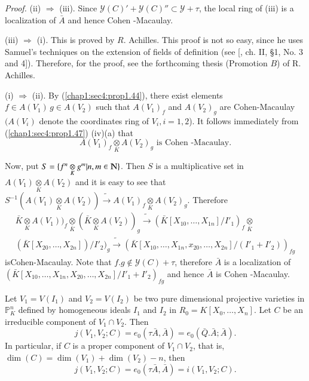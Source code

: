 \noindent \textit{Proof.}
(ii) $\Rightarrow$ (iii). Since $\mathscr{Y}(C)'+\mathscr
  {Y}(C)''\subset \mathscr{Y}+ \tau$, the local ring of (iii) is a
  localization of $\bar{A}$ and hence Cohen -Macaulay.  

(iii) $\Rightarrow$ (i). This is proved by $R$. Achilles. This proof
  is not so easy, since he uses Samuel's techniques on the extension
  of fields of definition (see [\cite{69}, ch. II, \S 1, No. 3  and
    4]). Therefore, for the proof, see the forthcoming thesis
  (Promotion $B$) of R. Achilles. 

(i) $\Rightarrow$ (ii). By (\ref{chap1:sec4:prop1.44}), there exist
  elements $f \in  
  A(V_1)\, g \in  A(V_2) $ such that $A(V_1)_f$ and $A(V_2)_g$
  are Cohen-Macaulay $(A(V_i)$ denote the coordinates ring of $ V_i,i=
  1,2$). It follows immediately from (\ref{chap1:sec4:prop1.47}) (iv)(a) that  
  \begin{equation*}
    A(V_1)_f  \underset{K}{\otimes} A(V_2)_g \text{ is Cohen
      -Macaulay.}\tag*{$\Box$} 
  \end{equation*}

Now, put $S=\{f^n \underset{K}{\otimes}g^m |n,m \in 
\varmathbb{N}\}$. Then $S$ is a multiplicative set in $ A(V_1)
\underset{K}{\otimes}A(V_2)$ and it is easy to see that 
 $S^{-1}(A(V_1) \underset{K}{\otimes}A(V_2)) \widetilde
 {\rightarrow}A(V_1)_f \underset{K}\otimes
 A(V_2)_g$. Therefore 
\begin{multline*}
   \bar{K}\underset{K}\otimes A(V_1)) _f \underset{\bar{K}}{\otimes} (
   \bar{K} \underset{K}{\otimes} A(V_2))_g \widetilde {
     \rightarrow}(\bar{K}[X_{10}, \ldots,
     X_{1n}]/I'_1)_f\underset{\bar{K}}{\otimes}\\ 
   (\bar{K}[X_{20}, \ldots, X_{2n}])/ I'_2)_g	 
   \widetilde {\rightarrow}(\bar{K}[X_{10}, \ldots, X_{1n}, x_{20},
   \ldots, X_{2n}]/ (I'_1+I'_2))_{fg} 
\end{multline*}
is\pageoriginale Cohen-Macaulay. Note that $f.g \notin \mathscr{Y}(C)+ \tau $,
therefore $\bar{A}$ is a localization of $(\bar{K}[X_{10},\ldots,
  X_{1n},X_{20},\ldots, X_{2n}]/I'_1+ I'_2)_{fg}$ and hence $\bar{A}$
is Cohen -Macaulay.		 

\setcounter{proposition}{21}
\begin{proposition}\label{chap3:sec2:prop3.22}
  Let  $V_1=V(I_1)$ and $V_2=V(I_2)$ be two pure dimensional projective
  varieties in $\mathbb{P}^n_K $ defined by homogeneous ideals
  $I_1 $ and $I_2$ in $R_0=K[X_0, \ldots, X_n]$. Let $C$ be an
  irreducible component of $ V_1 \cap V_2$. Then  
  $$
  j(V_1,V_2;C)=e_0(\tau \bar{A},\bar{A})=e_0 (\bar{Q}.\bar{A};\bar{A}).
  $$
  In particular, if $C$  is a proper component of $V_1 \cap V_2$, that
  is, $\dim (C) =\dim (V_1)+\dim(V_2)-n $, then 
  $$  
  j(V_1,V_2;C) =e_0 (\tau \bar{A},\bar{A}) =i(V_1, V_2;C).
  $$
\end{proposition}

